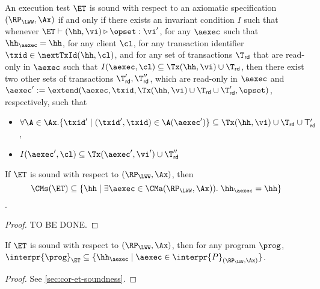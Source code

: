 \begin{definition}
\label{def:et_sound}
An execution test $\ET$ is sound with respect to an axiomatic 
specification $(\RP_{\LWW}, \Ax)$ if and only if there exists an 
invariant condition $I$ such that whenever $\ET \vdash (\hh, \vi) 
\triangleright \opset: \vi'$, for any $\aexec$ such that 
$\hh_{\aexec} = \hh$, for any client $\cl$, for any 
transaction identifier $\txid \in \nextTxId(\hh, \cl)$, 
and for any set of transactions $\T_{\mathsf{rd}}$ that are 
read-only in $\aexec$ such that  $I(\aexec, \cl) \subseteq \Tx(\hh, \vi) \cup \T_{\mathsf{rd}}$, then  
there exist two other sets of transactions $\T'_{\mathsf{rd}}, \T''_{\mathsf{rd}}$, 
which are read-only in $\aexec$ and $\aexec' := \extend(\aexec, \txid, 
\Tx(\hh,\vi) \cup \T_{\mathsf{rd}} \cup \T'_{\mathsf{rd}}, \opset)$, respectively, such that 
\begin{itemize}
\item $\forall \A \in \Ax. \{\txid' \mid (\txid', \txid) \in \A(\aexec')\} \subseteq \Tx(\hh, \vi) \cup \T_{\mathsf{rd}} \cup \mathsf{T}'_{\mathsf{rd}}$, 
\item $I(\aexec', \cl) \subseteq \Tx(\aexec', \vi') \cup \T''_{\mathsf{rd}}$
\end{itemize}
\end{definition}

\begin{theorem}
\label{thm:et_soundness}
If $\ET$ is sound with respect to $(\RP_{\LWW}, \Ax)$, then 
\[
    \CMs(\ET) \subseteq \{ \hh \mid \exists \aexec \in \CMa(\RP_{\LWW}, \Ax)).\;\hh_{\aexec} = \hh\}
\].
\end{theorem}
\begin{proof}
    TO BE DONE.
\end{proof}

\begin{corollary}
\label{thm:et_soundness}
\label{cor:et-soundness}
If $\ET$ is sound with respect to $(\RP_{\LWW}, \Ax)$, then 
for any program $\prog$, $\interpr{\prog}_{\ET} \subseteq \{ \hh_{\aexec} \mid \aexec \in \interpr{P}_{(\RP_{\LWW}, \Ax)} \}$.
\end{corollary}
\begin{proof}
See \cref{sec:cor-et-soundness}.
\end{proof}

